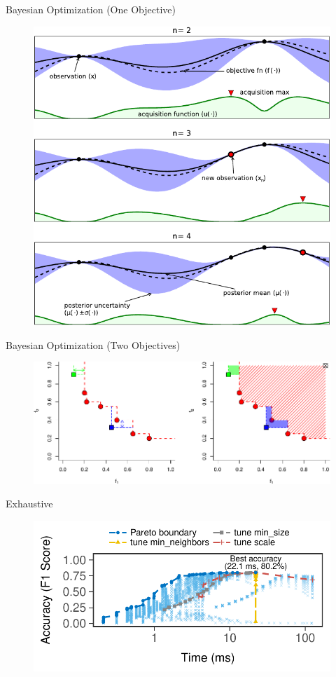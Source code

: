 \begin{frame}{Bayesian Optimization (One Objective)}
  \vspace{1em}
  \begin{figure}
    \centering
    \includegraphics[width=0.5\linewidth]{figures/serving-bo-illustration.pdf}
    \caption{\cite{shahriari2016taking}}
  \end{figure}
\end{frame}

\begin{frame}{Bayesian Optimization (Two Objectives)}
  \vspace{1em}
  \begin{figure}
    \centering
    \includegraphics[width=0.95\linewidth]{figures/serving-bo-2d}
    \caption{\cite{binoisgpareto}}
  \end{figure}
\end{frame}

\begin{frame}{Exhaustive}
  \vspace{1em}
  \begin{figure}
    \centering
    \includegraphics[width=0.95\linewidth]{figures/serving-eval-exhaustive.pdf}
  \end{figure}
\end{frame}

